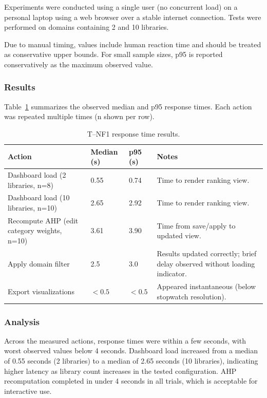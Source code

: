 \documentclass[12pt, titlepage]{article}
\begin{document}
Experiments were conducted using a single user (no concurrent load) on a personal
laptop using a web browser over a stable internet connection. Tests were performed
on domains containing 2 and 10 libraries.

Due to manual timing, values include human reaction time and should be treated as
conservative upper bounds. For small sample sizes, p95 is reported conservatively
as the maximum observed value.

\subsubsection{Results}
Table~\ref{tab:tnf1-results} summarizes the observed median and p95 response
times. Each action was repeated multiple times (n shown per row).

\begin{table}[H]
  \centering
  \caption{T--NF1 response time results.}
  \label{tab:tnf1-results}
  \begin{tabular}{@{}p{}p{}p{}%
                  p{}@{}}
    \toprule
    \textbf{Action} & \textbf{Median (s)} & \textbf{p95 (s)} & \textbf{Notes} \\
    \midrule
    Dashboard load (2 libraries, n=8) &
      0.55 & 0.74 &
      Time to render ranking view. \\
    Dashboard load (10 libraries, n=10) &
      2.65 & 2.92 &
      Time to render ranking view. \\
    Recompute AHP (edit category weights, n=10) &
      3.61 & 3.90 &
      Time from save/apply to updated view. \\
    Apply domain filter &
      2.5 & 3.0 &
      Results updated correctly; brief delay observed without loading indicator. \\
    Export visualizations &
      $<0.5$ & $<0.5$ &
      Appeared instantaneous (below stopwatch resolution). \\
    \bottomrule
  \end{tabular}
\end{table}

\subsubsection{Analysis}
Across the measured actions, response times were within a few seconds, with
worst observed values below 4 seconds. Dashboard load increased from a median
of 0.55 seconds (2 libraries) to a median of 2.65 seconds (10 libraries),
indicating higher latency as library count increases in the tested
configuration. AHP recomputation completed in under 4 seconds in all trials,
which is acceptable for interactive use.
\end{document}
